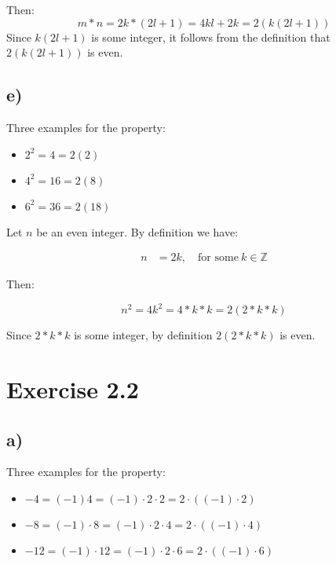 \documentclass{article}
\begin{document}
Then:
\begin{equation*}
	m * n = 2k * (2l + 1) = 4kl + 2k = 2(k(2l + 1))
\end{equation*}
\noindent
Since $k(2l + 1)$ is some integer, it follows from the definition that $2(k(2l + 1))$ is
even.


\subsection*{e)}


Three examples for the property:

\begin{itemize}
	\item $2^2=4=2(2)$
	\item $4^2 = 16 = 2(8)$
	\item $6^2 = 36 = 2(18)$
\end{itemize}


Let $n$ be an even integer. By definition we have:

\begin{align*}
	n &= 2k, \quad \mbox{for some}\ k \in \mathbb{Z}
\end{align*}

Then:

\begin{equation*}
	n^2 = 4k^2 = 4 * k * k = 2(2*k*k)
\end{equation*}

Since $2*k*k$ is some integer, by definition $2(2*k*k)$ is even.


\section*{Exercise 2.2}

\subsection*{a)}


Three examples for the property:

\begin{itemize}
	\item $-4 = (-1)4 = (-1) \cdot 2 \cdot 2 = 2 \cdot ((-1)\cdot 2)$
	\item $-8 = (-1) \cdot 8 = (-1) \cdot 2 \cdot 4 = 2 \cdot ((-1)\cdot 4)$
	\item $-12 = (-1) \cdot 12 = (-1) \cdot 2 \cdot 6 = 2 \cdot ((-1)\cdot
		6)$
\end{itemize}
\end{document}
